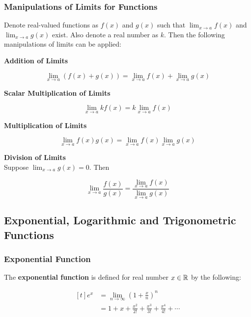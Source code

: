 \documentclass[a4paper,12pt]{article}
\begin{document}
\subsubsection{Manipulations of Limits for Functions}
\begin{thm}
  Denote real-valued functions as $f(x)$ and $g(x)$ such that $\lim_{x\to a}f(x)$ and $\lim_{x\to a}g(x)$ exist. Also denote a real number as $k$. Then the following manipulations of limits can be applied:

  \begin{alist}
    \item \textbf{Addition of Limits}

    $$\lim_{x\to a}(f(x)+g(x))=\lim_{x\to a}f(x)+\lim_{x\to a}g(x)$$

    \item \textbf{Scalar Multiplication of Limits}

    $$\lim_{x\to a}kf(x)=k\lim_{x\to a}f(x)$$

    \item \textbf{Multiplication of Limits}

    $$\lim_{x\to a}f(x)g(x)=\lim_{x\to a}f(x)\lim_{x\to a}g(x)$$

    \item \textbf{Division of Limits}\\
    Suppose $\lim_{x\to a}g(x)=0$. Then

    $$\lim_{x\to a}\frac{f(x)}{g(x)}=\frac{\lim_{x\to a}f(x)}{\lim_{x\to a}g(x)}$$
  \end{alist}
\end{thm}

\subsection{Exponential, Logarithmic and Trigonometric Functions}
\subsubsection{Exponential Function}
\begin{dft}
  The \textbf{exponential function} is defined for real number $x\in \mathbb{R}$ by the following:

  $$\begin{aligned}[t]
    e^{x}&=\lim_{n\to \infty}\left( 1+\frac{x}{n}\right)^{n}\\
    &=1+x+\frac{x^{2}}{2!}+\frac{x^{3}}{3!}+\frac{x^{4}}{4!}+\cdots
  \end{aligned}$$
\end{dft}\n
\end{document}
